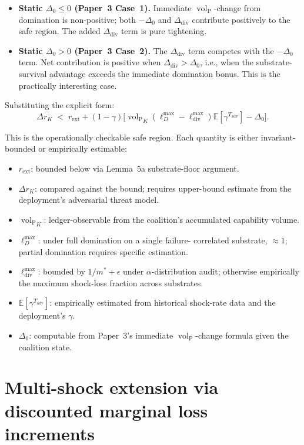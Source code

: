 \documentclass{article}
\DeclareMathOperator{\vol}{vol}
\newcommand{\volL}{{\vol_{\mathrm{P}}}}
\newcommand{\rext}{r_{\mathrm{ext}}}
\newcommand{\Tadv}{T_{\mathrm{adv}}}
\newcommand{\Ddiv}{\Delta_{\mathrm{div}}}
\newcommand{\lossDmax}{\ell_D^{\max}}
\newcommand{\lossdivmax}{\ell_{\mathrm{div}}^{\max}}
\begin{document}
\begin{itemize}
\item \textbf{Static $\Delta_0 \leq 0$ (Paper~3 Case~1).}  Immediate
  $\volL$-change from domination is non-positive; both $-\Delta_0$
  and $\Ddiv$ contribute positively to the safe region.  The added
  $\Ddiv$ term is pure tightening.
\item \textbf{Static $\Delta_0 > 0$ (Paper~3 Case~2).}  The $\Ddiv$
  term competes with the $-\Delta_0$ term.  Net contribution is
  positive when $\Ddiv > \Delta_0$, i.e., when the
  substrate-survival advantage exceeds the immediate domination
  bonus.  This is the practically interesting case.
\end{itemize}

Substituting the explicit form:
\begin{equation}
\label{eq:safe_region_concrete}
\Delta r_K \;<\; \rext + (1 - \gamma)\bigl[\volL_K (\lossDmax -
\lossdivmax) \mathbb{E}[\gamma^{\Tadv}] - \Delta_0\bigr].
\end{equation}

This is the operationally checkable safe region.  Each quantity is
either invariant-bounded or empirically estimable:
\begin{itemize}
\item $\rext$: bounded below via Lemma~5a substrate-floor argument.
\item $\Delta r_K$: compared against the bound; requires upper-bound
  estimate from the deployment's adversarial threat model.
\item $\volL_K$: ledger-observable from the coalition's accumulated
  capability volume.
\item $\lossDmax$: under full domination on a single failure-
  correlated substrate, $\approx 1$; partial domination requires
  specific estimation.
\item $\lossdivmax$: bounded by $1/m^* + \epsilon$ under
  $\alpha$-distribution audit; otherwise empirically the maximum
  shock-loss fraction across substrates.
\item $\mathbb{E}[\gamma^{\Tadv}]$: empirically estimated from
  historical shock-rate data and the deployment's $\gamma$.
\item $\Delta_0$: computable from Paper~3's immediate
  $\volL$-change formula given the coalition state.
\end{itemize}

\section{Multi-shock extension via discounted marginal loss increments}
\end{document}
